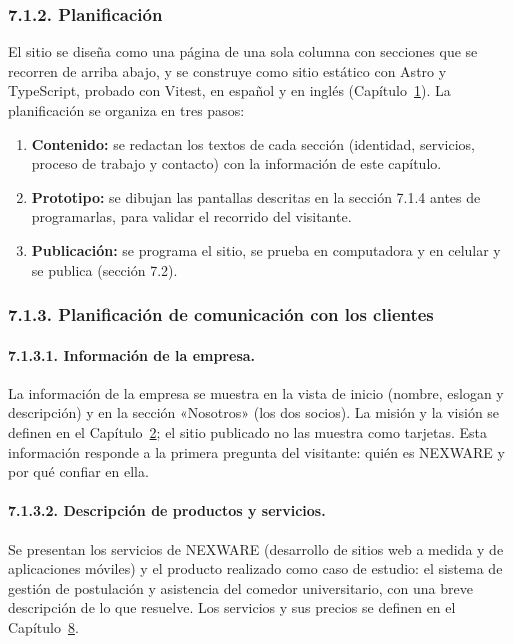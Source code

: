\subsubsection{7.1.2. Planificación}

El sitio se diseña como una página de una sola columna con secciones que se recorren de arriba abajo, y se construye como sitio estático con Astro y TypeScript, probado con Vitest, en español y en inglés (Capítulo~\hyperref[cap:paps]{1}). La planificación se organiza en tres pasos:

\begin{enumerate}
    \item \textbf{Contenido:} se redactan los textos de cada sección (identidad, servicios, proceso de trabajo y contacto) con la información de este capítulo.
    \item \textbf{Prototipo:} se dibujan las pantallas descritas en la sección 7.1.4 antes de programarlas, para validar el recorrido del visitante.
    \item \textbf{Publicación:} se programa el sitio, se prueba en computadora y en celular y se publica (sección 7.2).
\end{enumerate}

\subsubsection{7.1.3. Planificación de comunicación con los clientes}

\paragraph{7.1.3.1. Información de la empresa.}

La información de la empresa se muestra en la vista de inicio (nombre, eslogan y descripción) y en la sección «Nosotros» (los dos socios). La misión y la visión se definen en el Capítulo~\hyperref[cap:sqap]{2}; el sitio publicado no las muestra como tarjetas. Esta información responde a la primera pregunta del visitante: quién es NEXWARE y por qué confiar en ella.

\paragraph{7.1.3.2. Descripción de productos y servicios.}

Se presentan los servicios de NEXWARE (desarrollo de sitios web a medida y de aplicaciones móviles) y el producto realizado como caso de estudio: el sistema de gestión de postulación y asistencia del comedor universitario, con una breve descripción de lo que resuelve. Los servicios y sus precios se definen en el Capítulo~\hyperref[cap:mercado]{8}.

